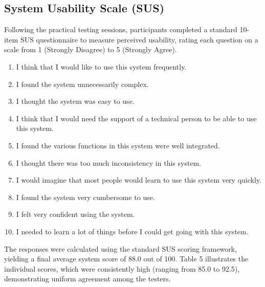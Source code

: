 \documentclass{icsthesis}
\begin{document}
\begin{mainmatter}
            \subsection{System Usability Scale (SUS)}
            Following the practical testing sessions, participants completed a standard 10-item SUS questionnaire to measure perceived usability, rating each question on a scale from 1 (Strongly Disagree) to 5 (Strongly Agree).
            \begin{enumerate}
                \item I think that I would like to use this system frequently.
                \item I found the system unnecessarily complex.
                \item I thought the system was easy to use.
                \item I think that I would need the support of a technical person to be able to use this system.
                \item I found the various functions in this system were well integrated.
                \item I thought there was too much inconsistency in this system.
                \item I would imagine that most people would learn to use this system very quickly.
                \item I found the system very cumbersome to use.
                \item I felt very confident using the system.
                \item I needed to learn a lot of things before I could get going with this system.
            \end{enumerate}
            
            The responses were calculated using the standard SUS scoring framework, yielding a final average system score of 88.0 out of 100. Table 5 illustrates the individual scores, which were consistently high (ranging from 85.0 to 92.5), demonstrating uniform agreement among the testers.
            

\end{mainmatter}
\end{document}
